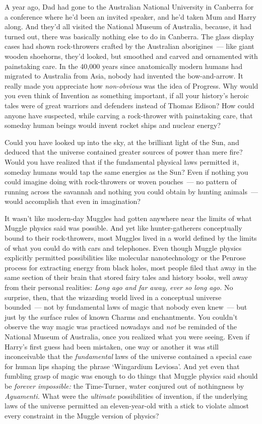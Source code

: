 A year ago, Dad had gone to the Australian National University in Canberra for
a conference where he'd been an invited speaker, and he'd taken Mum and Harry
along. And they'd all visited the National Museum of Australia, because, it had
turned out, there was basically nothing else to do in Canberra. The glass
display cases had shown rock-throwers crafted by the Australian
aborigines~--- like giant wooden shoehorns, they'd looked, but smoothed and
carved and ornamented with painstaking care. In the 40,000 years since
anatomically modern humans had migrated to Australia from Asia, nobody had
invented the bow-and-arrow. It really made you appreciate how
\emph{non-obvious} was the idea of Progress. Why would you even think of
Invention as something important, if all your history's heroic tales were of
great warriors and defenders instead of Thomas Edison? How could anyone have
suspected, while carving a rock-thrower with painstaking care, that someday
human beings would invent rocket ships and nuclear energy?

Could you have looked up into the sky, at the brilliant light of the Sun, and
deduced that the universe contained greater sources of power than mere fire?
Would you have realized that if the fundamental physical laws permitted it,
someday humans would tap the same energies as the Sun? Even if nothing you
could imagine doing with rock-throwers or woven pouches~--- no pattern of running
across the savannah and nothing you could obtain by hunting animals~--- would
accomplish that even in imagination?

It wasn't like modern-day Muggles had gotten anywhere near the limits of what
Muggle physics said was possible. And yet like hunter-gatherers conceptually
bound to their rock-throwers, most Muggles lived in a world defined by the
limits of what you could do with cars and telephones. Even though Muggle
physics explicitly permitted possibilities like molecular nanotechnology or the
Penrose process for extracting energy from black holes, most people filed that
away in the same section of their brain that stored fairy tales and history
books, well away from their personal realities: \emph{Long ago and far away,
ever so long ago.} No surprise, then, that the wizarding world lived in a
conceptual universe bounded~--- not by fundamental laws of magic that nobody even
knew~--- but just by the surface rules of known Charms and enchantments. You
couldn't observe the way magic was practiced nowadays and \emph{not} be
reminded of the National Museum of Australia, once you realized what you were
seeing. Even if Harry's first guess had been mistaken, one way or another it
was still inconceivable that the \emph{fundamental} laws of the universe
contained a special case for human lips shaping the phrase `Wingardium
Leviosa'. And yet even that fumbling grasp of magic was enough to do things
that Muggle physics said should be \emph{forever impossible:} the Time-Turner,
water conjured out of nothingness by \emph{Aguamenti.} What were the
\emph{ultimate} possibilities of invention, if the underlying laws of the
universe permitted an eleven-year-old with a stick to violate almost every
constraint in the Muggle version of physics?

